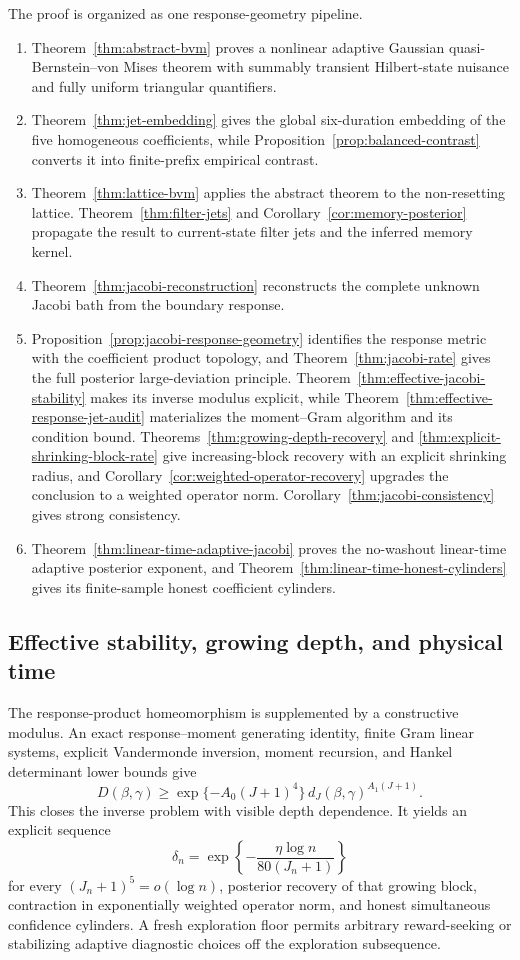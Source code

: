 The proof is organized as one response-geometry pipeline.
\begin{enumerate}
\item Theorem~\ref{thm:abstract-bvm} proves a nonlinear adaptive Gaussian
quasi-Bernstein--von Mises theorem with summably transient Hilbert-state
nuisance and fully uniform triangular quantifiers.
\item Theorem~\ref{thm:jet-embedding} gives the global six-duration embedding
of the five homogeneous coefficients, while
Proposition~\ref{prop:balanced-contrast} converts it into finite-prefix
empirical contrast.
\item Theorem~\ref{thm:lattice-bvm} applies the abstract theorem to the
non-resetting lattice.  Theorem~\ref{thm:filter-jets} and
Corollary~\ref{cor:memory-posterior} propagate the result to current-state
filter jets and the inferred memory kernel.
\item Theorem~\ref{thm:jacobi-reconstruction} reconstructs the complete
unknown Jacobi bath from the boundary response.
\item Proposition~\ref{prop:jacobi-response-geometry} identifies the response
metric with the coefficient product topology, and
Theorem~\ref{thm:jacobi-rate} gives the full posterior large-deviation
principle.  Theorem~\ref{thm:effective-jacobi-stability} makes its inverse
modulus explicit, while Theorem~\ref{thm:effective-response-jet-audit}
materializes the moment--Gram algorithm and its condition bound.
Theorems~\ref{thm:growing-depth-recovery} and
\ref{thm:explicit-shrinking-block-rate} give increasing-block recovery with
an explicit shrinking radius, and
Corollary~\ref{cor:weighted-operator-recovery} upgrades the conclusion to a
weighted operator norm.  Corollary~\ref{thm:jacobi-consistency} gives strong
consistency.
\item Theorem~\ref{thm:linear-time-adaptive-jacobi} proves the no-washout
linear-time adaptive posterior exponent, and
Theorem~\ref{thm:linear-time-honest-cylinders} gives its finite-sample honest
coefficient cylinders.
\end{enumerate}

\subsection{Effective stability, growing depth, and physical time}

The response-product homeomorphism is supplemented by a constructive modulus.
An exact response--moment generating identity, finite Gram linear systems,
explicit Vandermonde inversion, moment recursion, and Hankel determinant lower
bounds give
\[
 D(\beta,\gamma)\ge
 \exp\{-A_0(J+1)^4\}\,d_J(\beta,\gamma)^{A_1(J+1)}.
\]
This closes the inverse problem with visible depth dependence.  It yields an
explicit sequence
\[
 \delta_n=\exp\left\{-\frac{\eta\log n}{80(J_n+1)}\right\}
\]
for every \((J_n+1)^5=o(\log n)\), posterior recovery of that growing block,
contraction in exponentially weighted operator norm, and honest simultaneous
confidence cylinders.  A fresh exploration floor permits arbitrary
reward-seeking or stabilizing adaptive diagnostic choices off the exploration
subsequence.

